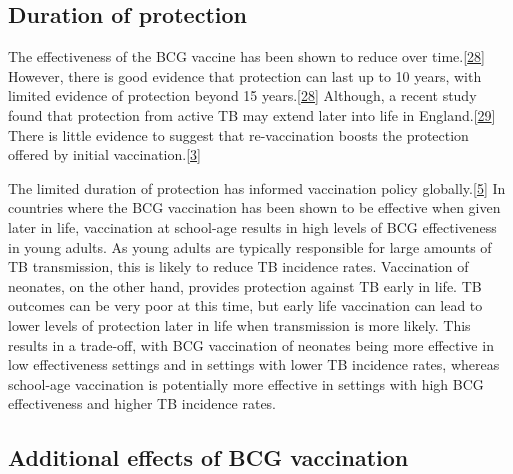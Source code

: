 \documentclass[11pt,twoside]{bristolthesis}
\begin{document}
  \hypertarget{duration-of-protection}{%
  \subsection{Duration of protection}\label{duration-of-protection}}
  
  The effectiveness of the BCG vaccine has been shown to reduce over time.{[}\protect\hyperlink{ref-Abubakar2013}{28}{]} However, there is good evidence that protection can last up to 10 years, with limited evidence of protection beyond 15 years.{[}\protect\hyperlink{ref-Abubakar2013}{28}{]} Although, a recent study found that protection from active TB may extend later into life in England.{[}\protect\hyperlink{ref-Mangtani2017}{29}{]} There is little evidence to suggest that re-vaccination boosts the protection offered by initial vaccination.{[}\protect\hyperlink{ref-TheWorldHealthOrganization:2018va}{3}{]}
  
  The limited duration of protection has informed vaccination policy globally.{[}\protect\hyperlink{ref-Zwerling2011a}{5}{]} In countries where the BCG vaccination has been shown to be effective when given later in life, vaccination at school-age results in high levels of BCG effectiveness in young adults. As young adults are typically responsible for large amounts of TB transmission, this is likely to reduce TB incidence rates. Vaccination of neonates, on the other hand, provides protection against TB early in life. TB outcomes can be very poor at this time, but early life vaccination can lead to lower levels of protection later in life when transmission is more likely. This results in a trade-off, with BCG vaccination of neonates being more effective in low effectiveness settings and in settings with lower TB incidence rates, whereas school-age vaccination is potentially more effective in settings with high BCG effectiveness and higher TB incidence rates.
  
  \hypertarget{additional-effects-of-bcg-vaccination}{%
  \subsection{Additional effects of BCG vaccination}\label{additional-effects-of-bcg-vaccination}}
  
\end{document}
